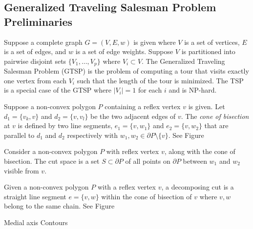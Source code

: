 \documentclass[../main.tex]{subfiles}
\begin{document}
\subsection{Generalized Traveling Salesman Problem Preliminaries}
Suppose a complete graph $G=(V,E,w)$ is given where $V$ is a set of vertices, $E$ is a set of edges, and $w$ is a set of edge weights. Suppose $V$ is partitioned into pairwise disjoint sets $\{V_1,\ldots,V_p\}$ where $V_i\subset V$. The Generalized Traveling Salesman Problem (GTSP) is the problem of computing a tour that visits exactly one vertex from each $V_i$ such that the length of the tour is minimized. The TSP is a special case of the GTSP where $|V_i|=1$ for each $i$ and is NP-hard.

\begin{definition}[Altitude]

\end{definition}

\begin{definition}
\label{def:cone_of_bisection}
Suppose a non-convex polygon $P$ containing a reflex vertex $v$ is given. Let $d_1=\{v_k, v\}$ and $d_2=\{v, v_l\}$ be the two adjacent edges of $v$. The \emph{cone of bisection} at $v$ is defined by two line segments, $e_1=\{v, w_1\}$ and $e_2=\{v, w_2\}$ that are parallel to $d_1$ and $d_2$ respectively with $w_1, w_2\in{\partial P\setminus\{v\}}$. See Figure%
\end{definition}

\begin{definition}
\label{def:cut_space}
Consider a non-convex polygon $P$ with reflex vertex $v$, along with the cone of bisection. The cut space is a set $S\subset\partial P$ of all points on $\partial P$ between $w_1$ and $w_2$ visible from $v$.
\end{definition}

\begin{definition}
\label{def:decomposing_cut}
Given a non-convex polygon $P$ with a reflex vertex $v$, a decomposing cut is a straight line segment $e=\{v,w\}$ within the cone of bisection of $v$ where $v,w$ belong to the same chain. See Figure~%
\end{definition}

Medial axis
Contours
\end{document}
